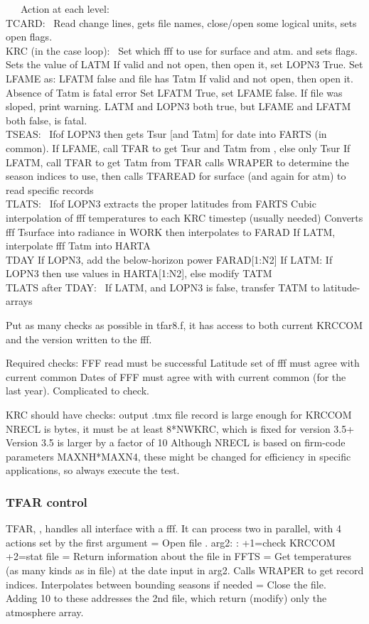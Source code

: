 \ \ \ Action at each level:
\\ TCARD: \ Read change lines, gets file names, close/open some logical units, sets open flags.
\\ KRC (in the case loop): \ Set which fff to use for surface and atm. and sets flags.
\qi Sets the value of LATM
\qi If  valid and not open, then open it, set LOPN3 True.
\qii Set LFAME as:  LFATM false and file has Tatm
\qi If  valid and not open, then open it. Absence of Tatm is fatal error
\qii Set LFATM True, set LFAME false.  If file was sloped, print warning.
\qi LATM and LOPN3 both true, but LFAME and LFATM both false, is fatal.
\\ TSEAS: \ Ifof LOPN3 then gets Tsur  [and Tatm] for date into FARTS (in common).
\qi If LFAME, call TFAR to get Tsur and Tatm from  ,  else only Tsur
\qi If LFATM, call TFAR to get Tatm from 
\qi TFAR calls WRAPER to determine the season indices to use,
\qii then calls TFAREAD for surface (and again for atm) to read specific records
\\ TLATS: \ Ifof LOPN3  extracts the proper latitudes from FARTS
\qi Cubic interpolation of fff temperatures to each KRC timestep (usually needed)
\qii Converts fff Tsurface into radiance in WORK then interpolates to FARAD
\qi If LATM, interpolate fff Tatm into HARTA
\\ TDAY
\qi If LOPN3, add the below-horizon power FARAD[1:N2]
\qi If LATM: If LOPN3 then  use values in HARTA[1:N2], else modify TATM
\\  TLATS after TDAY: \ If LATM, and LOPN3 is false, transfer TATM to latitude-arrays

Put as many checks as possible in  tfar8.f, it has access to both current KRCCOM
and the version written to the fff.

Required checks:
\qi  FFF read must be successful
\qi  Latitude set of fff must agree with current common
\qi Dates of FFF must agree with with current common (for the last year).
\qii Complicated to check. 


KRC should have checks:
\qi output .tmx file record is large enough for KRCCOM
\qii NRECL is bytes, it must be at least 8*NWKRC, which is fixed for version 3.5+
\qiii Version 3.5  is larger by a factor of 10
\qii Although NRECL is based on firm-code parameters MAXNH*MAXN4, these might be changed for efficiency in specific applications, so always execute the test.

 
\subsubsection{TFAR control} %
TFAR, , handles all interface with a fff. It can process two in parallel, with 4 actions set by the first argument
 = Open file .  arg2: : +1=check KRCCOM  +2=stat file
 = Return information about the file in  FFTS
 = Get temperatures (as many kinds as in file) at the date input in arg2.
\qii Calls WRAPER to get record indices. Interpolates between bounding seasons if needed
 = Close the file. 
\\ Adding 10 to these addresses the 2nd file, which return (modify) only the atmosphere array.

